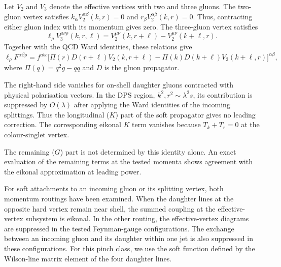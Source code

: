 \documentclass[%
 onecolumn,
 superscriptaddress,
 preprintnumbers,
 nofootinbib,
 amsmath,amssymb,
 aps,
 prl,
]{revtex4-2}
\begin{document}
Let $V_2$ and $V_3$ denote the effective
vertices with two and three gluons.
The two-gluon vertex satisfies
$k_\alpha V_2^{\alpha\beta}(k,r)=0$ and
$r_\beta V_2^{\alpha\beta}(k,r)=0$.
Thus, contracting either gluon index with
its momentum gives zero. The three-gluon
vertex satisfies
\begin{equation}
\ell_\rho V_3^{\mu\nu\rho}(k,r,\ell)
=V_2^{\mu\nu}(k,r+\ell)
-V_2^{\mu\nu}(k+\ell,r).
\end{equation}
Together with the QCD Ward identities,
these relations give
\begin{equation}
\ell_\rho F^{\alpha\beta\rho}
=f^{abc}\big[
\Pi(r)D(r+\ell)V_2(k,r+\ell)
-\Pi(k)D(k+\ell)V_2(k+\ell,r)
\big]^{\alpha\beta},
\label{eq:softward}
\end{equation}
where $\Pi(q)=q^2g-qq$ and $D$ is the
gluon propagator.

The right-hand side vanishes for on-shell
daughter gluons contracted with physical
polarisation vectors. In the DPS region,
$k^2,r^2\sim\lambda^2s$, its contribution
is suppressed by $O(\lambda)$ after applying
the Ward identities of the incoming
splittings. Thus the longitudinal ($K$)
part of the soft propagator gives no
leading correction. The corresponding
eikonal $K$ term vanishes because
$T_k+T_r=0$ at the colour-singlet vertex.

The remaining ($G$) part is not determined
by this identity alone. An exact evaluation
of the remaining terms at the tested
momenta shows agreement with the eikonal
approximation at leading power.

For soft attachments to an incoming gluon
or its splitting vertex, both momentum
routings have been examined. When the
daughter lines at the opposite hard vertex
remain near shell, the summed coupling at
the effective-vertex subsystem is eikonal.
In the other routing, the
effective-vertex diagrams are suppressed
in the tested Feynman-gauge configurations.
The exchange between an incoming gluon
and its daughter within one jet is also
suppressed in these configurations.
For this pinch class, we use the soft
function defined by the Wilson-line
matrix element of the four daughter lines.
\end{document}
